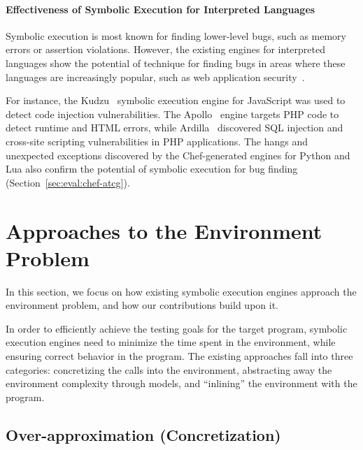 \paragraph{Effectiveness of Symbolic Execution for Interpreted Languages}

Symbolic execution is most known for finding lower-level bugs, such as memory errors or assertion violations.  However, the existing engines for interpreted languages show the potential of technique for finding bugs in areas where these languages are increasingly popular, such as web application security~\cite{saxena-kudzu,artzi-apollo, kiezun-ardilla}.

For instance, the Kudzu~\cite{saxena-kudzu} symbolic execution engine for JavaScript was used to detect code injection vulnerabilities.  The Apollo~\cite{artzi-apollo} engine targets PHP code to detect runtime and HTML errors, while Ardilla~\cite{kiezun-ardilla} discovered SQL injection and cross-site scripting vulnerabilities in PHP applications.
%
The hangs and unexpected exceptions discovered by the Chef-generated engines for Python and Lua also confirm the potential of symbolic execution for bug finding (Section~\ref{sec:eval:chef-atcg}).



\section{Approaches to the Environment Problem}
\label{sec:relwork:envproblem}

In this section, we focus on how existing symbolic execution engines approach the environment problem, and how our contributions build upon it.

In order to efficiently achieve the testing goals for the target program, symbolic execution engines need to minimize the time spent in the environment, while ensuring correct behavior in the program.
%
The existing approaches fall into three categories: concretizing the calls into the environment, abstracting away the environment complexity through models, and ``inlining'' the environment with the program.

\subsection{Over-approximation (Concretization)}


